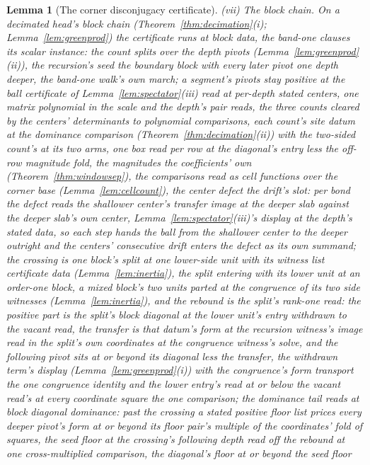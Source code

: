\documentclass[11pt]{article}
\newtheorem{lemma}{Lemma}
\theoremstyle{definition}
\begin{document}
\begin{lemma}[The corner disconjugacy certificate]
\emph{(vii) The block chain.} On a decimated head's block chain
(Theorem~\ref{thm:decimation}(i); Lemma~\ref{lem:greenprod}) the
certificate runs at block data, the band-one clauses its scalar
instance: the count splits over the depth pivots
(Lemma~\ref{lem:greenprod}(ii)), the recursion's seed the boundary
block with every later pivot one depth deeper, the band-one walk's
own march; a segment's pivots stay positive
at the ball certificate of Lemma~\ref{lem:spectator}(iii) read at
per-depth stated centers, one matrix polynomial in the scale and
the depth's pair reads, the three counts cleared by the centers'
determinants to polynomial comparisons, each count's site datum
at the dominance comparison (Theorem~\ref{thm:decimation}(ii))
with the two-sided count's at its two arms,
one box read per row at the diagonal's entry less the off-row
magnitude fold, the magnitudes the coefficients' own
(Theorem~\ref{thm:windowsep}), the comparisons read as cell
functions
over the corner base (Lemma~\ref{lem:cellcount}), the center
defect the drift's slot: per bond the defect reads the shallower
center's transfer image at the deeper slab against the deeper
slab's own center, Lemma~\ref{lem:spectator}(iii)'s
display at the depth's stated data, so each step hands the ball
from the shallower center to the deeper outright and the centers'
consecutive drift enters the defect as its own summand; the
crossing is one block's split at one
lower-side unit with its witness list certificate data
(Lemma~\ref{lem:inertia}), the split entering with its lower unit
at an order-one block, a mixed block's two units parted at the
congruence of its two side witnesses (Lemma~\ref{lem:inertia}),
and the rebound is the split's
rank-one read: the positive part is the split's block diagonal at
the lower unit's entry withdrawn to the vacant read, the transfer
is that datum's form at the recursion witness's image read in the
split's own coordinates at the congruence witness's solve, and
the following pivot sits at or beyond its diagonal less the
transfer, the withdrawn term's display
(Lemma~\ref{lem:greenprod}(i)) with the congruence's form
transport the one congruence identity and the lower entry's read
at or below the vacant read's at every coordinate square the one
comparison; the dominance tail reads at block diagonal dominance:
past the crossing a stated positive floor list prices every deeper
pivot's form at or beyond its floor pair's multiple of the
coordinates' fold of squares, the seed floor at the crossing's
following depth read off the rebound at one cross-multiplied
comparison, the diagonal's floor at or beyond the seed floor

\end{lemma}
\end{document}
